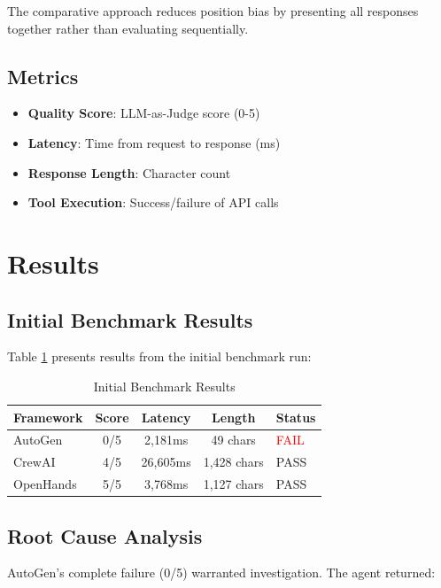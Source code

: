 \documentclass[11pt,a4paper]{article}
\begin{document}
The comparative approach reduces position bias by presenting all responses together rather than evaluating sequentially.

\subsection{Metrics}

\begin{itemize}
    \item \textbf{Quality Score}: LLM-as-Judge score (0-5)
    \item \textbf{Latency}: Time from request to response (ms)
    \item \textbf{Response Length}: Character count
    \item \textbf{Tool Execution}: Success/failure of API calls
\end{itemize}

\section{Results}

\subsection{Initial Benchmark Results}

Table \ref{tab:initial_results} presents results from the initial benchmark run:

\begin{table}[h]
\centering
\caption{Initial Benchmark Results}
\begin{tabular}{lcccl}
\toprule
\textbf{Framework} & \textbf{Score} & \textbf{Latency} & \textbf{Length} & \textbf{Status} \\
\midrule
AutoGen & 0/5 & 2,181ms & 49 chars & \textcolor{red}{FAIL} \\
CrewAI & 4/5 & 26,605ms & 1,428 chars & PASS \\
OpenHands & 5/5 & 3,768ms & 1,127 chars & PASS \\
\bottomrule
\end{tabular}
\label{tab:initial_results}
\end{table}

\subsection{Root Cause Analysis}

AutoGen's complete failure (0/5) warranted investigation. The agent returned:
\end{document}
